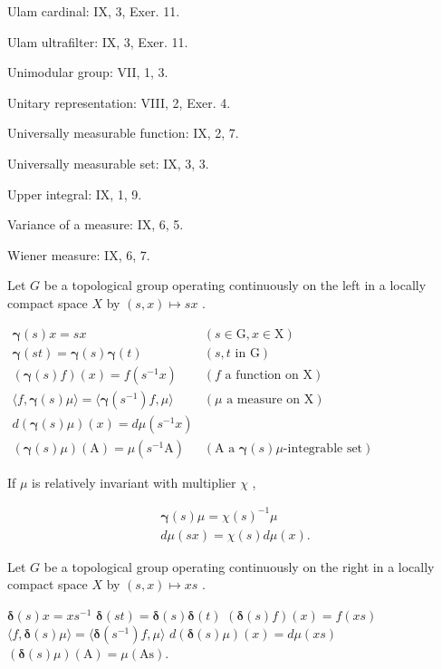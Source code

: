Ulam cardinal: IX, 3, Exer. 11.

Ulam ultrafilter: IX, 3, Exer. 11.

Unimodular group: VII, 1, 3.

Unitary representation: VIII, 2, Exer. 4.

Universally measurable function: IX, 2, 7.

Universally measurable set: IX, 3, 3.

Upper integral: IX, 1, 9.

Variance of a measure: IX, 6, 5.

Wiener measure: IX, 6, 7.



Let \(G\) be a topological group operating continuously on the left in a locally compact space \(X\) by \((s, x) \mapsto sx\) .

\(\begin{array}{ll}\pmb {\gamma}(s)x = sx & (s\in \mathrm{G},x\in \mathrm{X})\\ \pmb {\gamma}(st) = \pmb {\gamma}(s)\pmb {\gamma}(t) & (s,t\text{ in G})\\ (\pmb {\gamma}(s)f)(x) = f(s^{-1}x) & (f\text{ a function on X})\\ \langle f,\pmb {\gamma}(s)\mu \rangle = \langle \pmb {\gamma}(s^{-1})f,\mu \rangle & (\mu \text{ a measure on X})\\ d(\pmb {\gamma}(s)\mu)(x) = d\mu (s^{-1}x)\\ (\pmb {\gamma}(s)\mu)(\mathrm{A}) = \mu (s^{-1}\mathrm{A}) & (\mathrm{A}\text{ a }\pmb {\gamma}(s)\mu \text{-integrable set}) \end{array}\)

If \(\mu\) is relatively invariant with multiplier \(\chi\) ,

\[
\begin{array}{l} \pmb {\gamma} (s) \mu = \chi (s) ^ {- 1} \mu \\ d \mu (s x) = \chi (s) d \mu (x). \end{array}
\]

Let \(G\) be a topological group operating continuously on the right in a locally compact space \(X\) by \((s, x) \mapsto xs\) .

\(\pmb {\delta}(s)x = xs^{-1}\) \(\pmb {\delta}(st) = \pmb {\delta}(s)\pmb {\delta}(t)\) \((\pmb {\delta}(s)f)(x) = f(xs)\) \(\langle f,\pmb {\delta}(s)\mu \rangle = \langle \pmb {\delta}(s^{-1})f,\mu \rangle\) \(d(\pmb {\delta}(s)\mu)(x) = d\mu (xs)\) \((\pmb {\delta}(s)\mu)(\mathrm{A}) = \mu (\mathrm{As}).\)

